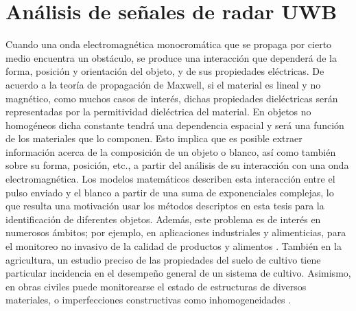 \chapter{Análisis de señales de radar UWB}\label{chap:sinalUWB}


Cuando una onda electromagnética monocromática que se propaga por cierto medio encuentra un obstáculo, se produce una interacción que dependerá de la forma, posición y orientación del objeto, y de sus propiedades eléctricas. De acuerdo a la teoría de propagación de Maxwell, si el material es lineal y no magnético, como muchos casos de interés, dichas propiedades dieléctricas serán representadas por la permitividad dieléctrica del material. En objetos no homogéneos dicha constante tendrá una dependencia espacial y será una función de los materiales que lo componen. Esto implica que es posible extraer información acerca de la composición de un objeto o blanco, así como también sobre su forma, posición, etc., a partir del análisis de su interacción con una onda electromagnética. Los modelos matemáticos \cite{Baum1971} describen esta interacción entre el pulso enviado y el blanco a partir de una suma de exponenciales complejas, lo que resulta una motivación usar los métodos descriptos en esta tesis para la identificación de diferentes objetos. Además, este problema es de interés en numerosos ámbitos; por ejemplo, en aplicaciones industriales y alimenticias, para el monitoreo no invasivo de la calidad de productos y alimentos \cite{Meng2018}. También en la agricultura, un estudio preciso de las propiedades del suelo de cultivo tiene particular incidencia en el desempeño general de un sistema de cultivo. Asimismo, en obras civiles puede monitorearse el estado de estructuras de diversos materiales, o imperfecciones constructivas como inhomogeneidades \cite{WAILOKLAI2018}. 

